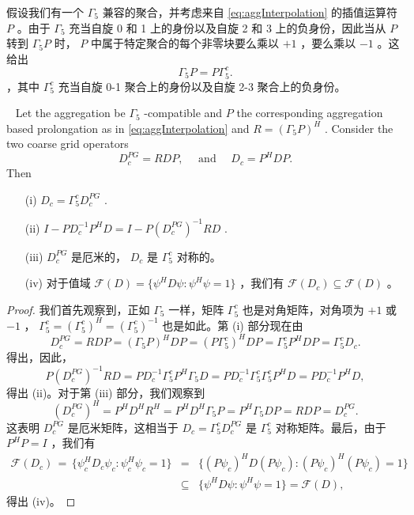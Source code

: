 \documentclass{siamltex}
\begin{document}
假设我们有一个    $\Gamma_5$    兼容的聚合，并考虑来自    \eqref{eq:aggInterpolation}    的插值运算符    $P$    。由于    $\Gamma_5$    充当自旋 0 和 1 上的身份以及自旋 2 和 3 上的负身份，因此当从    $P$    转到    $\Gamma_5P$    时，   $P$    中属于特定聚合的每个非零块要么乘以    $+1$    ，要么乘以    $-1$    。这给出
\begin{equation} \label{commute_with_g5}
  \Gamma_5 P = P \Gamma_5^c.
\end{equation}   ，其中    $\Gamma_5^c$    充当自旋 0-1 聚合上的身份以及自旋 2-3 聚合上的负身份。
\begin{lemma}~\label{lem:cgprops} Let the aggregation be         $\Gamma_5$        -compatible and         $P$         the corresponding aggregation based prolongation as in \eqref{eq:aggInterpolation} and         $R = (\Gamma_5P)^H$        . Consider the two coarse grid operators
  \[
    D_c^{PG} = RDP, \quad \mbox{ and } \quad D_c = P^HDP.
  \]
  Then
  \begin{itemize}   \item    [(i)]    $D_c = \Gamma_5^c D_c^{PG}$    .
    \item    [(ii)]    $I-PD_c^{-1}P^HD = I - P(D_c^{PG})^{-1}RD$    .
    \item    [(iii)]    $D_c^{PG}$    是厄米的，   $D_c$    是    $\Gamma_5^c$    对称的。
    \item    [(iv)] 对于值域    $\mathcal{F}(D)= \{ \psi^{H}D\psi : \psi^{H}\psi = 1 \} $    ，我们有    $\mathcal{F}(D_c) \subseteq \mathcal{F}(D)$    。  \end{itemize}
\end{lemma}
\begin{proof}我们首先观察到，正如    $\Gamma_5$    一样，矩阵    $\Gamma_5^c$    也是对角矩阵，对角项为    $+1$    或    $-1$    ，   $\Gamma_5^c = (\Gamma_5^c)^H = (\Gamma_5^c)^{-1}$    也是如此。第 (i) 部分现在由
  \[
    D_c^{PG} = RDP = (\Gamma_5P)^HDP = (P \Gamma_5^c)^HDP = \Gamma_5^c P^HDP = \Gamma_5^cD_c.
  \]    得出，因此，
  \[
    P(D^{PG}_c)^{-1}RD = P D_c^{-1} \Gamma_5^c P^H\Gamma_5 D = P D_c^{-1} \Gamma_5^c \Gamma_5^c P^H D  =  P D_c^{-1} P^H D,
  \]    得出 (ii)。对于第 (iii) 部分，我们观察到
  \[
    (D_c^{PG})^H = P^HD^HR^H = P^HD^H\Gamma_5P = P^H\Gamma_5 D P = RDP = D_c^{PG}.
  \]    这表明    $D_c^{PG}$    是厄米矩阵，这相当于    $D_c = \Gamma_5^cD_c^{PG}$    是    $\Gamma_5^c$    对称矩阵。最后，由于    $P^HP = I$    ，我们有
  \begin{eqnarray*}
    \mathcal{F}(D_c) \, = \,  \{  \psi_c^HD_c\psi_c: \psi_c^H\psi_c = 1  \}
    &=&  \{  (P\psi_c)^HD(P\psi_c): (P\psi_c)^H(P\psi_c) = 1  \}   \\
    &\subseteq&
    \{  \psi^HD\psi: \psi^H\psi = 1  \}  = \mathcal{F}(D),
  \end{eqnarray*}    得出 (iv)。  \end{proof}
\end{document}
